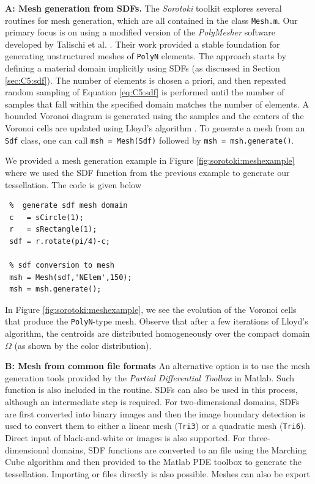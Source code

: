 \textbf{A: Mesh generation from SDFs.} The \textit{Sorotoki} toolkit explores several routines for mesh generation, which are all contained in the class \texttt{Mesh.m}. Our primary focus is on using a modified version of the \textit{PolyMesher} software developed by Talischi et al. \cite{Talischi2012Mar}. Their work provided a stable foundation for generating unstructured meshes of \texttt{PolyN} elements. The approach starts by defining a material domain implicitly using SDFs (as discussed in Section \ref{sec:C5:sdf}). The number of elements is chosen a priori, and then repeated random sampling of Equation \eqref{eq:C5:sdf} is performed until the number of samples that fall within the specified domain matches the number of elements. A bounded Voronoi diagram is generated using the samples and the centers of the Voronoi cells are updated using Lloyd's algorithm \cite{Lloyd1982Mar}. To generate a mesh from an \texttt{Sdf} class, one can call \texttt{msh = Mesh(Sdf)} followed by \texttt{msh = msh.generate()}.  \\

\begin{example}
We provided a mesh generation example in Figure \ref{fig:sorotoki:meshexample} where we used the SDF function from the previous example to generate our tessellation. The code is given below
%
\begin{lstlisting}[style=matlab] 
 %% EXAMPLE: Mesh class 
 %  generate sdf mesh domain 
 c   = sCircle(1);    
 r   = sRectangle(1);  
 sdf = r.rotate(pi/4)-c; 
    
 % sdf conversion to mesh 
 msh = Mesh(sdf,'NElem',150);
 msh = msh.generate();
\end{lstlisting}
%
In Figure \ref{fig:sorotoki:meshexample}, we see the evolution of the Voronoi cells that produce the \texttt{PolyN}-type mesh. Observe that after a few iterations of Lloyd's algorithm, the centroids are distributed homogeneously over the compact domain $\Omega$ (as shown by the color distribution).
\end{example}
%
\textbf{B: Mesh from common file formats} An alternative option is to use the mesh generation tools provided by the \textit{Partial Differential Toolbox} in Matlab. Such function is also included in the  routine. SDFs can also be used in this process, although an intermediate step is required. For two-dimensional domains, SDFs are first converted into binary images and then the image boundary detection is used to convert them to either a linear mesh (\texttt{Tri3}) or a quadratic mesh (\texttt{Tri6}). Direct input of black-and-white  or  images is also supported. For three-dimensional domains, SDF functions are converted to an  file using the Marching Cube algorithm \cite{Lorensen1987Aug} and then provided to the Matlab PDE toolbox to generate the tessellation. Importing  or  files directly is also possible. Meshes can also be export
